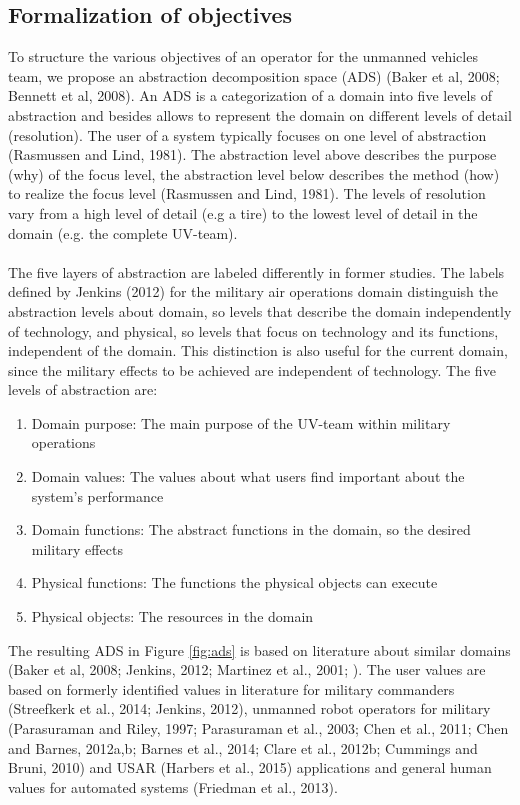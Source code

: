 \documentclass[twoside,twocolumn]{article}
\begin{document}
\subsection{Formalization of objectives}
To structure the various objectives of an operator for the unmanned vehicles team, we propose an abstraction decomposition space (ADS) (Baker et al, 2008; Bennett et al, 2008). An ADS is a categorization of a domain into five levels of abstraction and besides allows to represent the domain on different levels of detail (resolution). The user of a system typically focuses on one level of abstraction (Rasmussen and Lind, 1981). The abstraction level above describes the purpose (why) of the focus level, the abstraction level below describes the method (how) to realize the focus level (Rasmussen and Lind, 1981). The levels of resolution vary from a high level of detail (e.g a tire) to the lowest level of detail in the domain (e.g. the complete UV-team).
\\\\
The five layers of abstraction are labeled differently in former studies. The labels defined by Jenkins (2012) for the military air operations domain distinguish the abstraction levels about domain, so levels that describe the domain independently of technology, and physical, so levels that focus on technology and its functions, independent of the domain. This distinction is also useful for the current domain, since the military effects to be achieved are independent of technology. The five levels of abstraction are: 
\begin{enumerate}
	\item Domain purpose: The main purpose of the UV-team within military operations
	\item Domain values: The values about what users find important about the system's performance
	\item Domain functions: The abstract functions in the domain, so the desired military effects
	\item Physical functions: The functions the physical objects can execute
	\item Physical objects: The resources in the domain
\end{enumerate}
%
The resulting ADS in Figure \ref{fig:ads} is based on literature about similar domains (Baker et al, 2008; Jenkins, 2012; Martinez et al., 2001; ). The user values are based on formerly identified values in literature for military commanders (Streefkerk et al., 2014; Jenkins, 2012), unmanned robot operators for military (Parasuraman and Riley, 1997; Parasuraman et al., 2003; Chen et al., 2011; Chen and Barnes, 2012a,b; Barnes et al., 2014; Clare et al., 2012b; Cummings and Bruni, 2010) and USAR (Harbers et al., 2015) applications and general human values for automated systems (Friedman et al., 2013).
\end{document}
